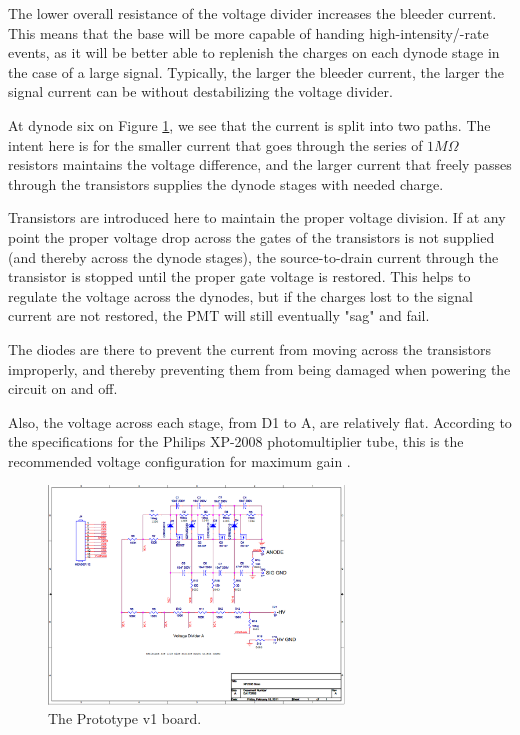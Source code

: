 The lower overall resistance of the voltage divider increases the bleeder current. This means that the base will be more capable of handing high-intensity/-rate events, as it will be better able to replenish the charges on each dynode stage in the case of a large signal. Typically, the larger the bleeder current, the larger the signal current can be without destabilizing the voltage divider.

At dynode six on Figure \ref{fig:v1-board}, we see that the current is split into two paths. The intent here is for the smaller current that goes through the series of $1M\Omega$ resistors maintains the voltage difference, and the larger current that freely passes through the transistors supplies the dynode stages with needed charge.

Transistors are introduced here to maintain the proper voltage division. If at any point the proper voltage drop across the gates of the transistors is not supplied (and thereby across the dynode stages), the source-to-drain current through the transistor is stopped until the proper gate voltage is restored. This helps to regulate the voltage across the dynodes, but if the charges lost to the signal current are not restored, the PMT will still eventually "sag" and fail.

The diodes are there to prevent the current from moving across the transistors improperly, and thereby preventing them from being damaged when powering the circuit on and off.

Also, the voltage across each stage, from D1 to A, are relatively flat. According to the specifications for the Philips XP-2008 photomultiplier tube, this is the recommended voltage configuration for maximum gain \cite{tubespecs}.

\begin{figure}[h]
	\centerline{
		\mbox{\includegraphics[width=0.7\textwidth]{figures/newbase.png}}
	}
	\caption{The Prototype v1 board.}
	\label{fig:v1-board}
\end{figure}

